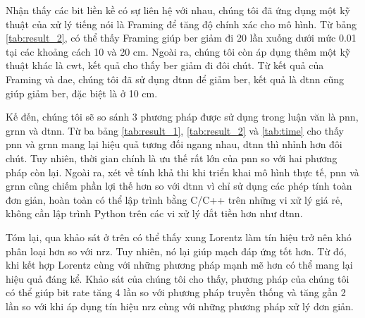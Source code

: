 Nhận thấy các bit liền kề có sự liên hệ với nhau, chúng tôi đã ứng dụng một kỹ thuật của xử lý tiếng nói là Framing để tăng độ chính xác cho mô hình. Từ bảng \ref{tab:result_2}, có thể thấy Framing giúp \ac{ber} giảm đi 20 lần xuống dưới mức 0.01 tại các khoảng cách 10 và 20 cm. Ngoài ra, chúng tôi còn áp dụng thêm một kỹ thuật khác là \ac{cwt}, kết quả cho thấy \ac{ber} giảm đi đôi chút. Từ kết quả của Framing và \ac{dae}, chúng tôi đã sử dụng \ac{dtnn} để giảm \ac{ber}, kết quả là \ac{dtnn} cũng giúp giảm \ac{ber}, đặc biệt là ở 10 cm.

Kế đến, chúng tôi sẽ so sánh 3 phương pháp được sử dụng trong luận văn là \ac{pnn}, \ac{grnn} và \ac{dtnn}. Từ ba bảng \ref{tab:result_1}, \ref{tab:result_2} và \ref{tab:time} cho thấy \ac{pnn} và \ac{grnn} mang lại hiệu quả tương đối ngang nhau, \ac{dtnn} thì nhỉnh hơn đôi chút. Tuy nhiên, thời gian chính là ưu thế rất lớn của \ac{pnn} so với hai phương pháp còn lại. Ngoài ra, xét về tính khả thi khi triển khai mô hình thực tế, \ac{pnn} và \ac{grnn} cũng chiếm phần lợi thế hơn so với \ac{dtnn} vì chỉ sử dụng các phép tính toàn đơn giản, hoàn toàn có thể lập trình bằng C/C++ trên những vi xử lý giá rẻ, không cần lập trình Python trên các vi xử lý đắt tiền hơn như \ac{dtnn}.

Tóm lại, qua khảo sát ở trên có thể thấy xung Lorentz làm tín hiệu trở nên khó phân loại hơn so với \ac{nrz}. Tuy nhiên, nó lại giúp mạch đáp ứng tốt hơn. Từ đó, khi kết hợp Lorentz cùng với những phương pháp mạnh mẽ hơn có thể mang lại hiệu quả đáng kể. Khảo sát của chúng tôi cho thấy, phương pháp của chúng tôi có thể giúp bit rate tăng 4 lần so với phương pháp truyền thống và tăng gần 2 lần so với khi áp dụng tín hiệu \ac{nrz} cùng với những phương pháp xử lý đơn giản.